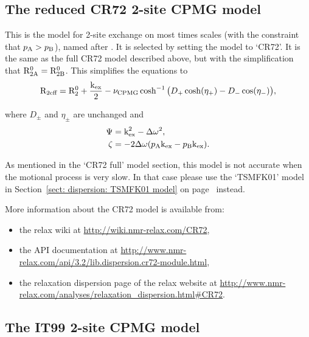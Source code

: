 
\subsection{The reduced CR72 2-site CPMG model}
\label{sect: dispersion: CR72 model}

This is the model for 2-site exchange on most times scales (with the constraint that $p_{\textrm{A}} > p_{\textrm{B}}$), named after \citet{CarverRichards72}.
It is selected by setting the model to `CR72'.
It is the same as the full CR72 model described above, but with the simplification that $\mathrm{R}_{\mathrm{2A}}^0 = \mathrm{R}_{\mathrm{2B}}^0$.
This simplifies the equations to
\begin{equation}
    \mathrm{R}_{\textrm{2eff}} = \mathrm{R}_2^0 + \frac{\textrm{k}_{\textrm{ex}}}{2} - \nu_{\textrm{CPMG}}\cosh^{-1} \big( D_+\cosh(\eta_+) - D_-\cos(\eta_-) \big) ,
\end{equation}

where $D_{\pm}$ and $\eta_{\pm}$ are unchanged and
\begin{align}
    \Psi  &= \textrm{k}_{\textrm{ex}}^2 - \Delta\omega^2 , \\
    \zeta &= -2\Delta\omega (p_{\textrm{A}}\textrm{k}_{\textrm{ex}} - p_{\textrm{B}}\textrm{k}_{\textrm{ex}}) .
\end{align}

As mentioned in the `CR72 full' model section, this model is not accurate when the motional process is very slow.
In that case please use the `TSMFK01' model in Section~\ref{sect: dispersion: TSMFK01 model} on page~\pageref{sect: dispersion: TSMFK01 model} instead.

More information about the CR72 model is available from:
\begin{itemize}
  \item the relax wiki at \url{http://wiki.nmr-relax.com/CR72},
  \item the API documentation at \url{http://www.nmr-relax.com/api/3.2/lib.dispersion.cr72-module.html},
  \item the relaxation dispersion page of the relax website at \url{http://www.nmr-relax.com/analyses/relaxation\_dispersion.html#CR72}.
\end{itemize}



\subsection{The IT99 2-site CPMG model}
\label{sect: dispersion: IT99 model}

